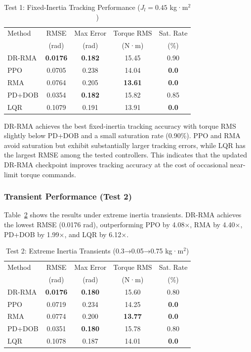 \documentclass[lettersize,journal]{IEEEtran}
\begin{document}
\begin{table}[t]
\centering
\caption{Test 1: Fixed-Inertia Tracking Performance ($J_l = 0.45$ kg·m$^2$)}
\label{tab:test1_results}
\begin{tabular}{@{}lcccc@{}}
\toprule
Method & RMSE & Max Error & Torque RMS & Sat. Rate \\
 & (rad) & (rad) & (N·m) & (\%) \\
\midrule
DR-RMA & \textbf{0.0176} & \textbf{0.182} & 15.45 & 0.90 \\
PPO & 0.0705 & 0.238 & 14.04 & \textbf{0.0} \\
RMA & 0.0764 & 0.205 & \textbf{13.61} & \textbf{0.0} \\
PD+DOB & 0.0354 & \textbf{0.182} & 15.82 & 0.85 \\
LQR & 0.1079 & 0.191 & 13.91 & \textbf{0.0} \\
\bottomrule
\end{tabular}
\end{table}

DR-RMA achieves the best fixed-inertia tracking accuracy with torque RMS slightly below PD+DOB and a small saturation rate (0.90\%). PPO and RMA avoid saturation but exhibit substantially larger tracking errors, while LQR has the largest RMSE among the tested controllers. This indicates that the updated DR-RMA checkpoint improves tracking accuracy at the cost of occasional near-limit torque commands.

\subsubsection{Transient Performance (Test 2)}

Table~\ref{tab:test2_results} shows the results under extreme inertia transients. DR-RMA achieves the lowest RMSE (0.0176 rad), outperforming PPO by 4.08×, RMA by 4.40×, PD+DOB by 1.99×, and LQR by 6.12×.

\begin{table}[t]
\centering
\caption{Test 2: Extreme Inertia Transients (0.3→0.05→0.75 kg·m$^2$)}
\label{tab:test2_results}
\begin{tabular}{@{}lcccc@{}}
\toprule
Method & RMSE & Max Error & Torque RMS & Sat. Rate \\
 & (rad) & (rad) & (N·m) & (\%) \\
\midrule
DR-RMA & \textbf{0.0176} & \textbf{0.180} & 15.60 & 0.80 \\
PPO & 0.0719 & 0.234 & 14.25 & \textbf{0.0} \\
RMA & 0.0774 & 0.200 & \textbf{13.77} & \textbf{0.0} \\
PD+DOB & 0.0351 & \textbf{0.180} & 15.78 & 0.80 \\
LQR & 0.1078 & 0.187 & 14.01 & \textbf{0.0} \\
\bottomrule
\end{tabular}
\end{table}
\end{document}
